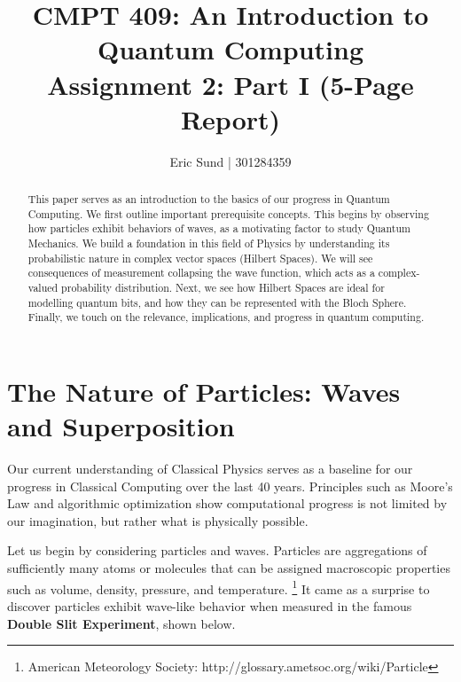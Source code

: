 \documentclass[letterpaper, 10 pt, conference]{ieeeconf}
\title{
CMPT 409: An Introduction to Quantum Computing \\
\large Assignment 2:  Part I (5-Page Report)
}
\author{Eric Sund | 301284359}
\begin{document}
\maketitle
\thispagestyle{empty}
\pagestyle{empty}


\begin{abstract}

This paper serves as an introduction to the basics of our progress in Quantum Computing.  We first outline important prerequisite concepts.  This begins by observing how particles exhibit behaviors of waves, as a motivating factor to study Quantum Mechanics.  We build a foundation in this field of Physics by understanding its probabilistic nature in complex vector spaces (Hilbert Spaces).  We will see consequences of measurement collapsing the wave function, which acts as a complex-valued probability distribution.  Next, we see how Hilbert Spaces are ideal for modelling quantum bits, and how they can be represented with the Bloch Sphere.  Finally, we touch on the relevance, implications, and progress in quantum computing.

\end{abstract}

\section{The Nature of Particles: Waves and Superposition}

Our current understanding of Classical Physics serves as a baseline for our progress in Classical Computing over the last 40 years.  Principles such as Moore's Law and algorithmic optimization show computational progress is not limited by our imagination, but rather what is physically possible.

Let us begin by considering particles and waves.  Particles are aggregations of sufficiently many atoms or molecules that can be assigned macroscopic properties such as volume, density, pressure, and temperature. \footnote{American Meteorology Society: http://glossary.ametsoc.org/wiki/Particle}  It came as a surprise to discover particles exhibit wave-like behavior when measured in the famous \textbf{Double Slit Experiment}, shown below.
\end{document}
